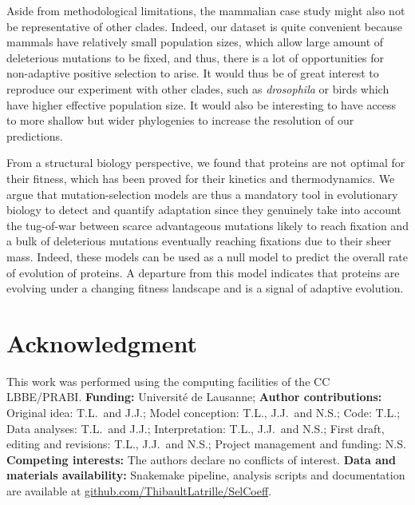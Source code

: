 \documentclass{article}
\begin{document}
    Aside from methodological limitations, the mammalian case study might also not be representative of other clades.
    Indeed, our dataset is quite convenient because mammals have relatively small population sizes, which allow large amount of deleterious mutations to be fixed, and thus, there is a lot of opportunities for non-adaptive positive selection to arise.
    It would thus be of great interest to reproduce our experiment with other clades, such as \textit{drosophila} or birds which have higher effective population size.
    It would also be interesting to have access to more shallow but wider phylogenies to increase the resolution of our predictions.

    From a structural biology perspective, we found that proteins are not optimal for their fitness, which has been proved for their kinetics and thermodynamics.
    We argue that mutation-selection models are thus a mandatory tool in evolutionary biology to detect and quantify adaptation since they genuinely take into account the tug-of-war between scarce advantageous mutations likely to reach fixation and a bulk of deleterious mutations eventually reaching fixations due to their sheer mass.
    Indeed, these models can be used as a null model to predict the overall rate of evolution of proteins\cite{spielman_relationship_2015, dosreis_how_2015}.
    A departure from this model indicates that proteins are evolving under a changing fitness landscape\cite{rodrigue_detecting_2017, tamuri_mutationselection_2021} and is a signal of adaptive evolution\cite{rodrigue_bayesian_2021}.

    \section*{Acknowledgment}
    \label{sec:acknowledgment}
    This work was performed using the computing facilities of the CC LBBE/PRABI\@.
    \textbf{Funding:}
    Université de Lausanne;
    \textbf{Author contributions:}
    Original idea: T.L.\ and J.J.;
    Model conception: T.L., J.J.\ and N.S.;
    Code: T.L.;
    Data analyses: T.L.\ and J.J.;
    Interpretation: T.L., J.J.\ and N.S.;
    First draft, editing and revisions: T.L., J.J.\ and N.S.;
    Project management and funding: N.S\@.
    \textbf{Competing interests:}
    The authors declare no conflicts of interest.
    \textbf{Data and materials availability:}
    Snakemake pipeline, analysis scripts and documentation are available at \href{https://github.com/ThibaultLatrille/SelCoeff}{github.com/ThibaultLatrille/SelCoeff}.
\end{document}

